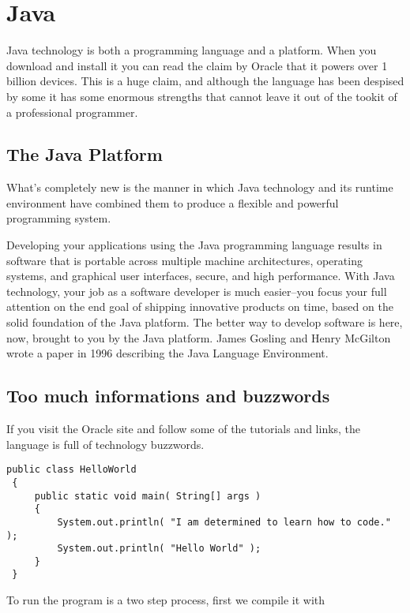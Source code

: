 \chapter{Java}

Java technology is both a programming language and a platform. When you download and install
it you can read the claim by Oracle that it powers over 1 billion devices. This is a huge
claim, and although the language has been despised by some it has some enormous strengths
that cannot leave it out of the tookit of a professional programmer. 

\section{The Java Platform}

What's completely new is the manner in which Java technology and its runtime environment have combined them to produce a flexible and powerful programming system.

Developing your applications using the Java programming language results in software that is portable across multiple machine architectures, operating systems, and graphical user interfaces, secure, and high performance. With Java technology, your job as a software developer is much easier--you focus your full attention on the end goal of shipping innovative products on time, based on the solid foundation of the Java platform. The better way to develop software is here, now, brought to you by the Java platform. James Gosling and Henry McGilton
wrote a paper in 1996 describing the Java Language Environment.

\section{Too much informations and buzzwords}

If you visit the Oracle site and follow some of the tutorials and links, the language is full
of technology buzzwords.

\begin{verbatim}
public class HelloWorld
 {
     public static void main( String[] args )
     {
         System.out.println( "I am determined to learn how to code." );
         System.out.println( "Hello World" );
     }
 }
\end{verbatim}

To run the program is a two step process, first we compile it with 

